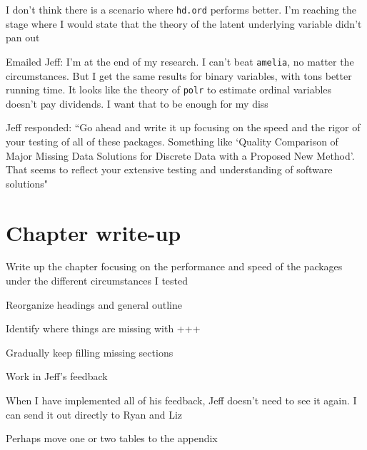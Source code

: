 \documentclass[12pt]{article}
\begin{document}
\begin{coi}
		\item I don't think there is a scenario where \texttt{hd.ord} performs better. I'm reaching the stage where I would state that the theory of the latent underlying variable didn't pan out
		\item Emailed Jeff: I'm at the end of my research. I can't beat \texttt{amelia}, no matter the circumstances. But I get the same results for binary variables, with tons better running time. It looks like the theory of \texttt{polr} to estimate ordinal variables doesn't pay dividends. I want that to be enough for my diss
		\item Jeff responded: ``Go ahead and write it up focusing on the speed and the rigor of your testing of all of these packages. Something like `Quality Comparison of Major Missing Data Solutions for Discrete Data with a Proposed New Method'. That seems to reflect your extensive testing and understanding of software solutions"
	\end{coi}


\section*{Chapter write-up}
	\begin{coi}
		\item Write up the chapter focusing on the performance and speed of the packages under the different circumstances I tested
		\item Reorganize headings and general outline
		\item Identify where things are missing with +++
		\item Gradually keep filling missing sections
		\item Work in Jeff's feedback
		\item When I have implemented all of his feedback, Jeff doesn't need to see it again. I can send it out directly to Ryan and Liz
		\item Perhaps move one or two tables to the appendix
	\end{coi}
\end{document}
